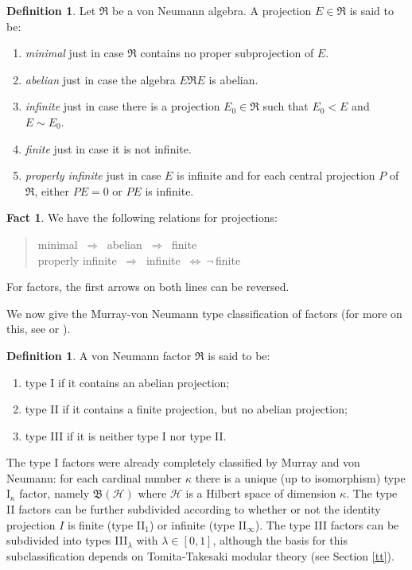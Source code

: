 \documentclass[12pt]{article}
\newcommand{\alg}[1]{\mathfrak{#1}}
\newcommand{\bh}{\mathfrak{B}(\mathcal{H})}
\theoremstyle{definition}
\newtheorem{fact}[thm]{Fact}
\theoremstyle{definition}
\newtheorem{defn}[thm]{Definition}
\theoremstyle{remark}
\def\2#1{{\mathcal #1}}
\def\al#1{{\mathfrak #1}}
\newcommand{\lra}{\:\Longrightarrow \:}
\begin{document}
\begin{defn} Let $\alg{R}$ be a von Neumann algebra.  A
  projection $E\in \alg{R}$ is said to be:
  \begin{enumerate}
  \item \emph{minimal} just in case $\alg{R}$ contains
    no proper subprojection of $E$.
  \item \emph{abelian} just in case the algebra $E\alg{R}E$ is abelian.
  \item \emph{infinite} just in case there is a
    projection $E_0\in \alg{R}$ such that $E_0<E$ and
    $E\sim E_0$.
  \item \emph{finite} just in case it is not infinite.
  \item \emph{properly infinite} just in case $E$ is infinite and for
    each central projection $P$ of $\al R$, either $PE=0$ or $PE$ is
    infinite.
  \end{enumerate}
\end{defn}

\begin{fact} We have the following relations for projections:
\begin{quote} \begin{center} minimal $\lra$ abelian $\lra$ finite  \\
    properly infinite $\lra$ infinite $\:\Longleftrightarrow \: \neg\,$finite
  \end{center} \end{quote} For factors, the first arrows on both lines can be
reversed.  \end{fact}

We now give the Murray-von Neumann type classification of factors (for
more on this, see \cite[Chap.\ 7]{kr} or \cite[Chap.\ 1]{sunder}).

\begin{defn} A von Neumann factor $\alg{R}$ is said to be: 
  \begin{enumerate}
  \item type I if it contains an abelian projection;
  \item type II if it contains a finite projection, but no abelian projection;
  \item type III if it is neither type I nor type II.
  \end{enumerate}
\end{defn}

The type I factors were already completely classified by Murray and
von Neumann: for each cardinal number $\kappa$ there is a unique (up
to isomorphism) type I$_\kappa$ factor, namely $\bh$ where $\2H$ is a
Hilbert space of dimension $\kappa$.  The type II factors can be
further subdivided according to whether or not the identity projection
$I$ is finite (type II$_1$) or infinite (type II$_{\infty}$).  The
type III factors can be subdivided into types III$_{\lambda}$ with
$\lambda \in [0,1]$, although the basis for this subclassification
depends on Tomita-Takesaki modular theory (see Section \ref{tt}).
\end{document}
